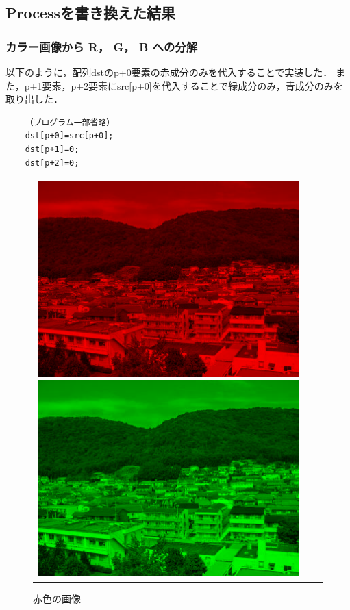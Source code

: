 \documentclass[11pt]{jarticle}
\begin{document}
\subsection{Processを書き換えた結果}
\subsubsection{カラー画像から R， G， B への分解}

以下のように，配列dstのp+0要素の赤成分のみを代入することで実装した．
また，p+1要素，p+2要素にsrc[p+0]を代入することで緑成分のみ，青成分のみを取り出した．

\begin{verbatim}
    （プログラム一部省略）
    dst[p+0]=src[p+0];
    dst[p+1]=0;
    dst[p+2]=0;
\end{verbatim}
\begin{figure}[htbp]
    \begin{tabular}{ccc}
        \begin{minipage}{0.33\hsize}
            \begin{center}
                \includegraphics[scale=.3]{1-4.png}
                \caption{赤色の画像}
            \end{center}
        \end{minipage}
        \begin{minipage}{0.33\hsize}
            \begin{center}
                \includegraphics[scale=.3]{1-4-1.png}

\end{center}
\end{minipage}
\end{tabular}
\end{figure}
\end{document}
